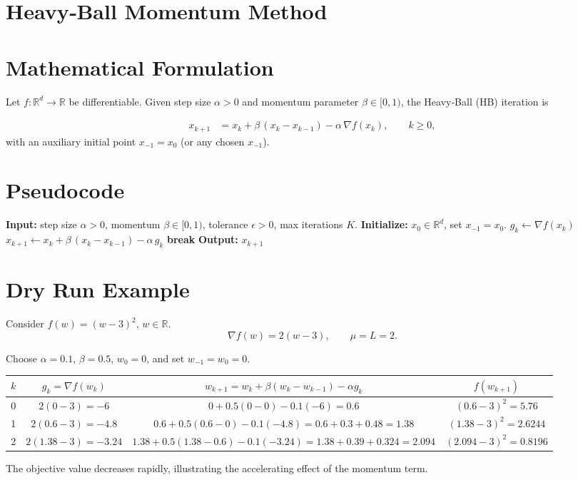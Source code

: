 \documentclass{article}
\begin{document}
\section*{Heavy‑Ball Momentum Method}

\section*{Mathematical Formulation}
Let $f:\mathbb{R}^{d}\rightarrow\mathbb{R}$ be differentiable.  
Given step size $\alpha>0$ and momentum parameter $\beta\in[0,1)$, the Heavy‑Ball (HB) iteration is  

\[
\boxed{
\begin{aligned}
x_{k+1}&=x_{k}+\beta\,(x_{k}-x_{k-1})-\alpha\,\nabla f(x_{k}),\qquad k\ge 0,
\end{aligned}}
\]
with an auxiliary initial point $x_{-1}=x_{0}$ (or any chosen $x_{-1}$).

\section*{Pseudocode}
\begin{algorithm}[H]
\caption{Heavy‑Ball Momentum}
\begin{algorithmic}[1]
\State \textbf{Input:} step size $\alpha>0$, momentum $\beta\in[0,1)$, tolerance $\epsilon>0$, max iterations $K$.
\State \textbf{Initialize:} $x_{0}\in\mathbb{R}^{d}$, set $x_{-1}=x_{0}$.
    \State $g_{k}\gets \nabla f(x_{k})$
    \State $x_{k+1}\gets x_{k}+\beta\,(x_{k}-x_{k-1})-\alpha\,g_{k}$
        \State \textbf{break}
    \EndIf
\EndFor
\State \textbf{Output:} $x_{k+1}$
\end{algorithmic}
\end{algorithm}

\section*{Dry Run Example}
Consider $f(w)=(w-3)^{2}$, $w\in\mathbb{R}$.
\[
\nabla f(w)=2(w-3),\qquad \mu= L =2.
\]

Choose $\alpha=0.1$, $\beta=0.5$, $w_{0}=0$, and set $w_{-1}=w_{0}=0$.

\begin{center}
\begin{tabular}{c|c|c|c}
$k$ & $g_{k}= \nabla f(w_{k})$ & $w_{k+1}= w_{k}+ \beta (w_{k}-w_{k-1})-\alpha g_{k}$ & $f(w_{k+1})$\\ \hline
0 & $2(0-3)=-6$ & $0+0.5(0-0)-0.1(-6)=0.6$ & $(0.6-3)^{2}=5.76$\\
1 & $2(0.6-3)=-4.8$ & $0.6+0.5(0.6-0)-0.1(-4.8)=0.6+0.3+0.48=1.38$ & $(1.38-3)^{2}=2.6244$\\
2 & $2(1.38-3)=-3.24$ & $1.38+0.5(1.38-0.6)-0.1(-3.24)=1.38+0.39+0.324=2.094$ & $(2.094-3)^{2}=0.8196$
\end{tabular}
\end{center}
The objective value decreases rapidly, illustrating the accelerating effect of the momentum term.
\end{document}
